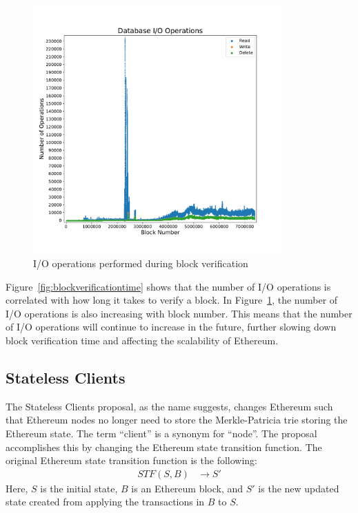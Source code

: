 \documentclass[12pt]{article}
\newcommand{\System}{Stateless Clients\xspace}
\newcommand{\figurewidth}{0.85\textwidth}
\begin{document}
\begin{figure}[H]
  \centering
  \includegraphics[width=\figurewidth]{../figures/results/graphs/background/db-io-ops.pdf}
  \caption{I/O operations performed during block verification}
  \label{fig:blockverification}
\end{figure}

Figure~\ref{fig:blockverificationtime} shows that the number of I/O operations is correlated with how long it takes to verify a block. In Figure~\ref{fig:blockverification}, the number of I/O operations is also increasing with block number. This means that the number of I/O operations will continue to increase in the future, further slowing down block verification time and affecting the scalability of Ethereum.

\subsection{\System}

The \System proposal, as the name suggests, changes Ethereum such that Ethereum nodes no longer need to store the Merkle-Patricia trie storing the Ethereum state. The term ``client'' is a synonym for ``node''. The proposal accomplishes this by changing the Ethereum state transition function. The original Ethereum state transition function is the following:
\begin{align*}
  STF(S, B) &\to S'
\end{align*}
Here, $S$ is the initial state, $B$ is an Ethereum block, and $S'$ is the new updated state created from applying the transactions in $B$ to $S$.
\end{document}
